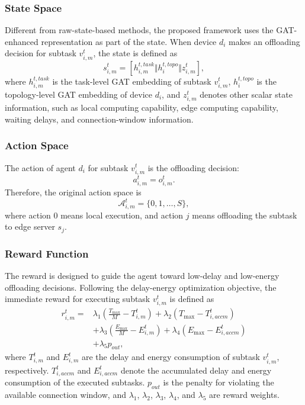 \documentclass[conference]{IEEEtran}
\begin{document}
\subsubsection{State Space}

Different from raw-state-based methods, the proposed framework uses the GAT-enhanced representation as part of the state. When device $d_i$ makes an offloading decision for subtask $v_{i,m}^t$, the state is defined as
\begin{equation}
s_{i,m}^t
=
[h_{i,m}^{t,task}
\Vert
h_i^{t,topo}
\Vert
z_{i,m}^t],
\end{equation}
where $h_{i,m}^{t,task}$ is the task-level GAT embedding of subtask $v_{i,m}^t$, $h_i^{t,topo}$ is the topology-level GAT embedding of device $d_i$, and $z_{i,m}^t$ denotes other scalar state information, such as local computing capability, edge computing capability, waiting delays, and connection-window information.

\subsubsection{Action Space}

The action of agent $d_i$ for subtask $v_{i,m}^t$ is the offloading decision:
\begin{equation}
a_{i,m}^t=o_{i,m}^t.
\end{equation}
Therefore, the original action space is
\begin{equation}
\mathcal{A}_{i,m}^t=\{0,1,\ldots,S\},
\end{equation}
where action $0$ means local execution, and action $j$ means offloading the subtask to edge server $s_j$.

\subsubsection{Reward Function}

The reward is designed to guide the agent toward low-delay and low-energy offloading decisions. Following the delay-energy optimization objective, the immediate reward for executing subtask $v_{i,m}^t$ is defined as
\begin{equation}
\begin{aligned}
r_{i,m}^t
=
&
\lambda_1
\left(
\frac{T_{\max}}{M}
-
T_{i,m}^t
\right)
+
\lambda_2
\left(
T_{\max}
-
T_{i,accm}^t
\right) \\
&
+
\lambda_3
\left(
\frac{E_{\max}}{M}
-
E_{i,m}^t
\right)
+
\lambda_4
\left(
E_{\max}
-
E_{i,accm}^t
\right) \\
&
+
\lambda_5 p_{out},
\end{aligned}
\end{equation}
where $T_{i,m}^t$ and $E_{i,m}^t$ are the delay and energy consumption of subtask $v_{i,m}^t$, respectively. $T_{i,accm}^t$ and $E_{i,accm}^t$ denote the accumulated delay and energy consumption of the executed subtasks. $p_{out}$ is the penalty for violating the available connection window, and $\lambda_1$, $\lambda_2$, $\lambda_3$, $\lambda_4$, and $\lambda_5$ are reward weights.
\end{document}
